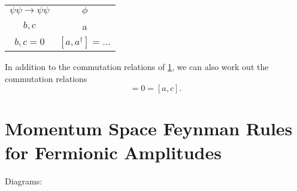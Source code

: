 
\begin{table}[htpb]
  \centering
  \begin{tabular}{c c}
  $\psi\psi \to \psi\psi$ &  $\phi$ \\
  $b, c$ & a \\
  ${b, c} = 0$ & $[a, a^{\dagger}] = \dots$ \\
  \end{tabular}
  \caption{}
  \label{tab:18-1}
\end{table}

In addition to the commutation relations of \ref{tab:18-1}, we can also work out the commutation relations 
\begin{equation}
  [a, b] = 0 = [a, c].
\end{equation}

\section{Momentum Space Feynman Rules for Fermionic Amplitudes}%
\label{sec:momentum_space_feynman_rules_for_fermionic_amplitudes}

Diagrams:
\begin{equation}
\end{equation}

